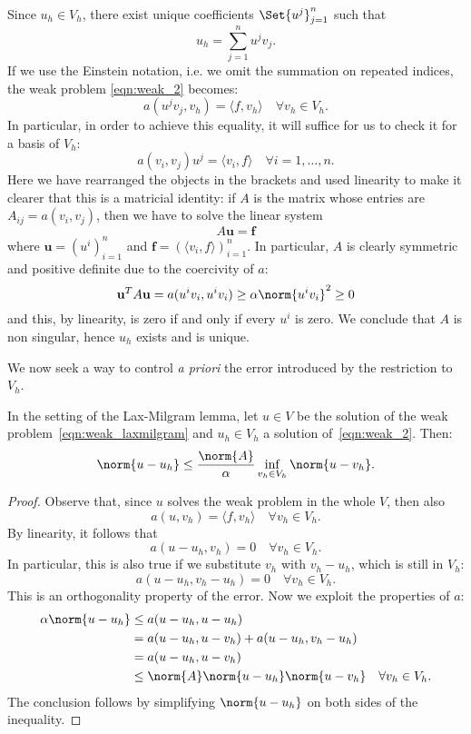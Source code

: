 Since $u_h \in V_h$, there exist unique coefficients $\Set{u^j}_{j=1}^n$ such that
\[
u_h = \sum_{j=1}^n u^j v_j.
\]
If we use the Einstein notation, i.e. we omit the summation on repeated indices, the weak problem \ref{eqn:weak_2} becomes:
\[
a(u^j v_j ,v_h) = \langle f,v_h \rangle \quad \forall v_h\in V_h.
\]
In particular, in order to achieve this equality, it will suffice for us to check it for a basis of $V_h$:
\[
a(v_i, v_j)  u^j = \langle v_i,f \rangle \quad \forall i=1,\dots,n.
\]
Here we have rearranged the objects in the brackets and used linearity to make it clearer that this is a matricial identity: if $A$ is the matrix whose entries are $A_{ij}=a(v_i, v_j)$, then we have to solve the linear system
\[
A \mathbf{u} = \mathbf{f}
\]
where $\mathbf{u}=(u^i)_{i=1}^n$ and $\mathbf{f}=(\langle v_i,f \rangle)_{i=1}^n$.
In particular, $A$ is clearly symmetric and positive definite due to the coercivity of $a$:
\[
\mathbf{u}^T A \mathbf{u} = a(u^i v_i, u^i v_i) \ge \alpha \norm{u^i v_i}^2 \ge 0
\]
and this, by linearity, is zero if and only if every $u^i$ is zero. We conclude that $A$ is non singular, hence $u_h$ exists and is unique.

We now seek a way to control \emph{a priori} the error introduced by the restriction to $V_h$.
\begin{lemma}[Ceà] \label{lemma:cea}
In the setting of the Lax-Milgram lemma, let $u\in V$ be the solution of the weak problem~\eqref{eqn:weak_laxmilgram} and $u_h \in V_h$ a solution of~\eqref{eqn:weak_2}. Then:
\[
\norm{u - u_h} \le \frac{\norm{A}}{\alpha} \inf_{v_h \in V_h} \norm{u - v_h}.
\]
\end{lemma}
\begin{proof}
Observe that, since $u$ solves the weak problem in the whole $V$, then also
\[
a(u,v_h) = \langle f,v_h \rangle \quad \forall v_h\in V_h.
\]
By linearity, it follows that
\[
a(u - u_h,v_h) = 0 \quad \forall v_h\in V_h.
\]
In particular, this is also true if we substitute $v_h$ with $v_h - u_h$, which is still in $V_h$:
\[
a(u - u_h, v_h - u_h) = 0 \quad \forall v_h\in V_h.
\]
This is an orthogonality property of the error. Now we exploit the properties of $a$:
\begin{align}
\alpha \norm{u - u_h} & \le a(u - u_h, u - u_h) \\
& = a(u - u_h, u - v_h) + a(u - u_h, v_h - u_h) \\
& = a(u - u_h, u - v_h) \\
& \le \norm{A} \norm {u - u_h} \norm {u - v_h} \quad \forall v_h \in V_h.
\end{align}
The conclusion follows by simplifying $\norm{u - u_h}$ on both sides of the inequality.
\end{proof}

